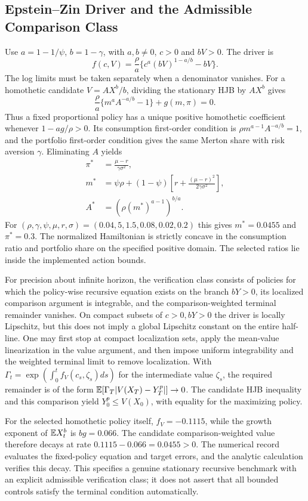 \subsection{Epstein--Zin Driver and the Admissible Comparison Class}
Use $a=1-1/\psi$, $b=1-\gamma$, with $a,b\ne0$, $c>0$ and $bV>0$. The driver is
\[
 f(c,V)=\frac\rho a\{c^a(bV)^{1-a/b}-bV\}.
\]
The log limits must be taken separately when a denominator vanishes. For a homothetic candidate $V=AX^b/b$, dividing the stationary HJB by $AX^b$ gives
\[
 \frac\rho a\{m^aA^{-a/b}-1\}+g(m,\pi)=0.
\]
Thus a fixed proportional policy has a unique positive homothetic coefficient whenever $1-ag/\rho>0$. Its consumption first-order condition is $\rho m^{a-1}A^{-a/b}=1$, and the portfolio first-order condition gives the same Merton share with risk aversion $\gamma$. Eliminating $A$ yields
\begin{align*}
 \pi^*&=\frac{\mu-r}{\gamma\sigma^2},\\
 m^*&=\psi\rho+(1-\psi)\left[r+\frac{(\mu-r)^2}{2\gamma\sigma^2}\right],\\
 A^*&=(\rho(m^*)^{a-1})^{b/a}.
\end{align*}
For $(\rho,\gamma,\psi,\mu,r,\sigma)=(0.04,5,1.5,0.08,0.02,0.2)$ this gives $m^*=0.0455$ and $\pi^*=0.3$. The normalized Hamiltonian is strictly concave in the consumption ratio and portfolio share on the specified positive domain. The selected ratios lie inside the implemented action bounds.

For precision about infinite horizon, the verification class consists of policies for which the policy-wise recursive equation exists on the branch $bY>0$, its localized comparison argument is integrable, and the comparison-weighted terminal remainder vanishes. On compact subsets of $c>0,bY>0$ the driver is locally Lipschitz, but this does not imply a global Lipschitz constant on the entire half-line. One may first stop at compact localization sets, apply the mean-value linearization in the value argument, and then impose uniform integrability and the weighted terminal limit to remove localization. With $\Gamma_t=\exp(\int_0^t f_V(c_s,\zeta_s)ds)$ for the intermediate value $\zeta_s$, the required remainder is of the form $\mathbb E[\Gamma_T|V(X_T)-Y_T^p|]\to0$. The candidate HJB inequality and this comparison yield $Y_0^p\leq V(X_0)$, with equality for the maximizing policy.

For the selected homothetic policy itself, $f_V=-0.1115$, while the growth exponent of $\mathbb E X_t^b$ is $bg=0.066$. The candidate comparison-weighted value therefore decays at rate $0.1115-0.066=0.0455>0$. The numerical record evaluates the fixed-policy equation and target errors, and the analytic calculation verifies this decay. This specifies a genuine stationary recursive benchmark with an explicit admissible verification class; it does not assert that all bounded controls satisfy the terminal condition automatically.

